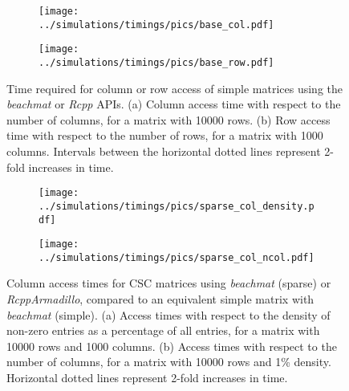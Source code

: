 \documentclass{article}
\newcommand{\beachmat}{\textit{beachmat}}
\begin{document}
\small



\newpage
\begin{figure}[bt]
    \centering
    \begin{subfigure}[b]{0.49\textwidth}
        \texttt{[image: ../simulations/timings/pics/base\_col.pdf]}
        \caption{}
    \end{subfigure}
    \begin{subfigure}[b]{0.49\textwidth}
        \texttt{[image: ../simulations/timings/pics/base\_row.pdf]}
        \caption{}
    \end{subfigure}
    \caption{Time required for column or row access of simple matrices using the \beachmat{} or \textit{Rcpp} APIs.
        (a) Column access time with respect to the number of columns, for a matrix with 10000 rows.
        (b) Row access time with respect to the number of rows, for a matrix with 1000 columns.
        Intervals between the horizontal dotted lines represent 2-fold increases in time.
    }
    \label{fig:basetime}
\end{figure}

\begin{figure}[bt]
    \centering
    \begin{subfigure}[b]{0.49\textwidth}
        \texttt{[image: ../simulations/timings/pics/sparse\_col\_density.pdf]}
        \caption{}
    \end{subfigure}
    \begin{subfigure}[b]{0.49\textwidth}
        \texttt{[image: ../simulations/timings/pics/sparse\_col\_ncol.pdf]}
        \caption{}
    \end{subfigure}
    \caption{Column access times for CSC matrices using \beachmat{} (sparse) or \textit{RcppArmadillo}, compared to an equivalent simple matrix with \beachmat{} (simple).
        (a) Access times with respect to the density of non-zero entries as a percentage of all entries, for a matrix with 10000 rows and 1000 columns.
        (b) Access times with respect to the number of columns, for a matrix with 10000 rows and 1\% density.
        Horizontal dotted lines represent 2-fold increases in time.
    }
    \label{fig:sparsecol}
\end{figure}
\end{document}
